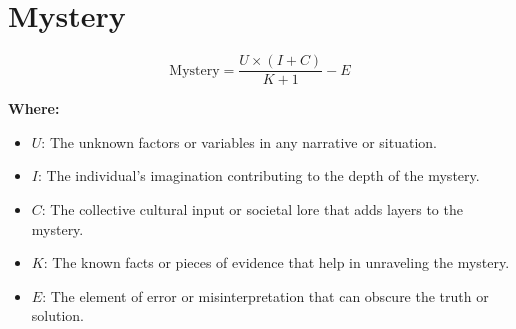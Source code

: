 \chapter{Mystery}

\begin{equation}
\text{Mystery} = \frac{U \times (I + C)}{K + 1} - E
\end{equation}

\textbf{Where:}

\begin{itemize}
    \item $U$: The unknown factors or variables in any narrative or situation.
    \item $I$: The individual's imagination contributing to the depth of the mystery.
    \item $C$: The collective cultural input or societal lore that adds layers to the mystery.
    \item $K$: The known facts or pieces of evidence that help in unraveling the mystery.
    \item $E$: The element of error or misinterpretation that can obscure the truth or solution.
\end{itemize}